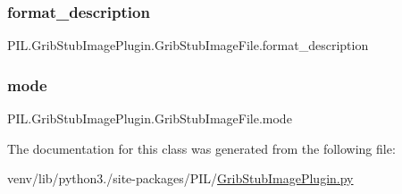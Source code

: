\subsubsection{\texorpdfstring{format\+\_\+description}{format\_description}}
{\footnotesize\ttfamily P\+I\+L.\+Grib\+Stub\+Image\+Plugin.\+Grib\+Stub\+Image\+File.\+format\+\_\+description\hspace{0.3cm}{\ttfamily [static]}}

\mbox{\label{classPIL_1_1GribStubImagePlugin_1_1GribStubImageFile_a8ee3b561fd579b0a030b796dc8fb40f5}} 
\subsubsection{\texorpdfstring{mode}{mode}}
{\footnotesize\ttfamily P\+I\+L.\+Grib\+Stub\+Image\+Plugin.\+Grib\+Stub\+Image\+File.\+mode}



The documentation for this class was generated from the following file\+:\begin{DoxyCompactItemize}
\item 
venv/lib/python3./site-\/packages/\+P\+I\+L/\hyperlink{GribStubImagePlugin_8py}{Grib\+Stub\+Image\+Plugin.\+py}\end{DoxyCompactItemize}
